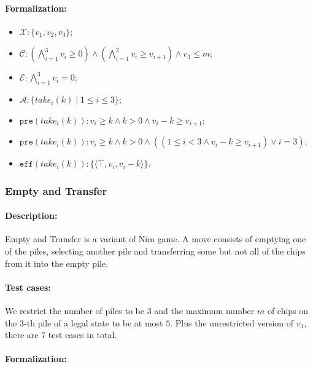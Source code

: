 \documentclass[review]{elsarticle}
\newcommand{\set}[1]{\{ #1 \}}
\newcommand{\tuple}[1]{\langle {#1} \rangle}
\newcommand{\true}{\top}
\newcommand{\statevar}{\mathcal{X}}
\newcommand{\act}{\mathcal{A}}
\newcommand{\constraint}{\mathcal{C}}
\newcommand{\estate}{\mathcal{E}}
\newcommand{\pre}{\mathtt{pre}}
\newcommand{\eff}{\mathtt{eff}}
\begin{document}
\paragraph{Formalization:}

\begin{itemize}
	\item $\statevar: \set{v_1,v_2,v_3}$;
	\item $\constraint: (\bigwedge_{i=1}^{3} v_i \ge 0) \wedge (\bigwedge_{i=1}^{2} v_i \ge v_{i+1}) \wedge v_3 \le m$;
	\item $\estate: \bigwedge_{i=1}^{3} v_i = 0$;
	\item $\act:\set{take_i(k) {\mid} 1\le i\le 3}$;
	\item $\pre(take_i(k)) : v_i \ge k \wedge k > 0 \wedge v_i -k \ge v_{i+1}$;
	\item {\color{red}$\pre(take_i(k)) : v_i \ge k \wedge k > 0 \wedge ((1 \le i < 3 \wedge v_i - k \ge v_{i+1}) \vee i = 3)$;}
	\item $\eff(take_i(k)) : \set{\tuple{\true,v_i,v_i -k}}$.
\end{itemize}

\subsubsection{Empty and Transfer \protect\cite{Fer1998}}
\paragraph{Description:} 
Empty and Transfer is a variant of Nim game.
A move consists of emptying one of the piles, selecting another pile and transferring some but not all of the chips from it into the empty pile. 

\paragraph{Test cases:}
We restrict the number of piles to be $3$ and the maximum number $m$ of chips on the $3$-th pile of a legal state to be at most $5$. 
Plus the unrestricted version of $v_3$, there are $7$ test cases in total.

\paragraph{Formalization:}
\end{document}
